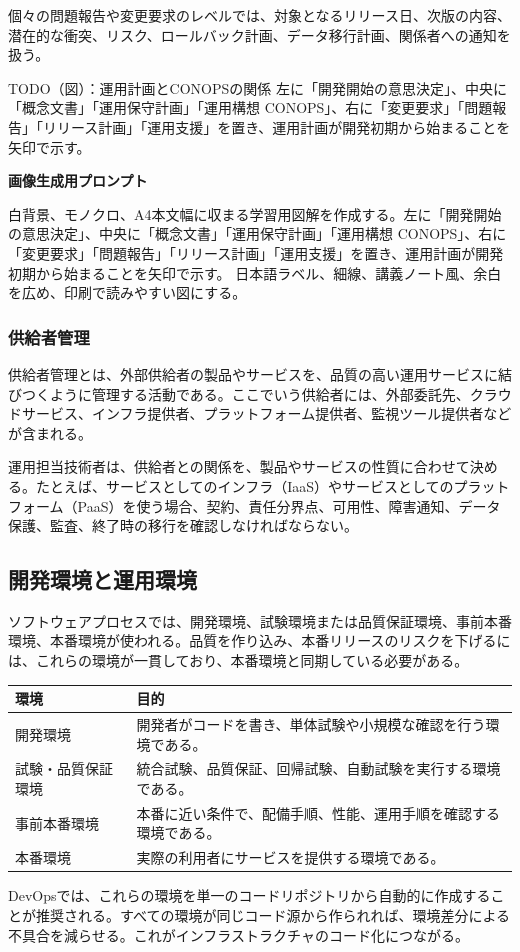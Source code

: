 \documentclass[uplatex,dvipdfmx,a4paper,10pt]{jsarticle}
\newcommand{\todoprompt}[2]{%
\begin{notebox}{TODO（図）：#1}
#2

\textbf{画像生成用プロンプト}

白背景、モノクロ、A4本文幅に収まる学習用図解を作成する。#2 日本語ラベル、細線、講義ノート風、余白を広め、印刷で読みやすい図にする。
\end{notebox}
}
\begin{document}
個々の問題報告や変更要求のレベルでは、対象となるリリース日、次版の内容、潜在的な衝突、リスク、ロールバック計画、データ移行計画、関係者への通知を扱う。

\todoprompt{運用計画とCONOPSの関係}{左に「開発開始の意思決定」、中央に「概念文書」「運用保守計画」「運用構想 CONOPS」、右に「変更要求」「問題報告」「リリース計画」「運用支援」を置き、運用計画が開発初期から始まることを矢印で示す。}

\subsubsection{供給者管理}

供給者管理とは、外部供給者の製品やサービスを、品質の高い運用サービスに結びつくように管理する活動である。ここでいう供給者には、外部委託先、クラウドサービス、インフラ提供者、プラットフォーム提供者、監視ツール提供者などが含まれる。

運用担当技術者は、供給者との関係を、製品やサービスの性質に合わせて決める。たとえば、サービスとしてのインフラ（IaaS）やサービスとしてのプラットフォーム（PaaS）を使う場合、契約、責任分界点、可用性、障害通知、データ保護、監査、終了時の移行を確認しなければならない。

\subsection{開発環境と運用環境}

ソフトウェアプロセスでは、開発環境、試験環境または品質保証環境、事前本番環境、本番環境が使われる。品質を作り込み、本番リリースのリスクを下げるには、これらの環境が一貫しており、本番環境と同期している必要がある。

\begin{longtable}{L{35mm}L{115mm}}
\toprule
環境 & 目的 \\
\midrule
開発環境 & 開発者がコードを書き、単体試験や小規模な確認を行う環境である。 \\
試験・品質保証環境 & 統合試験、品質保証、回帰試験、自動試験を実行する環境である。 \\
事前本番環境 & 本番に近い条件で、配備手順、性能、運用手順を確認する環境である。 \\
本番環境 & 実際の利用者にサービスを提供する環境である。 \\
\bottomrule
\end{longtable}

DevOpsでは、これらの環境を単一のコードリポジトリから自動的に作成することが推奨される。すべての環境が同じコード源から作られれば、環境差分による不具合を減らせる。これがインフラストラクチャのコード化につながる。
\end{document}
